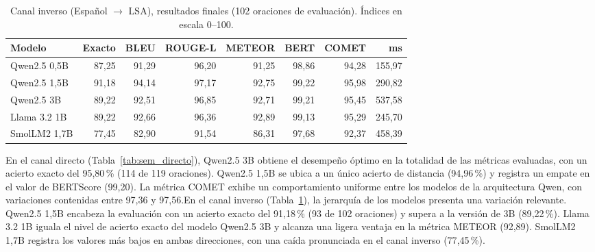 \begin{table}[H]
\centering
\footnotesize
\caption{Canal inverso (Español $\rightarrow$ LSA), resultados finales (102 oraciones de evaluación). Índices en escala 0--100.}
\label{tab:sem_inverso}
\begin{tabular}{lrrrrrrr}
\toprule
\textbf{Modelo} & \textbf{Exacto} & \textbf{BLEU} & \textbf{ROUGE-L} & \textbf{METEOR} & \textbf{BERT} & \textbf{COMET} & \textbf{ms} \\
\midrule
Qwen2.5 0,5B & 87,25 & 91,29 & 96,20 & 91,25 & 98,86 & 94,28 & 155,97 \\
Qwen2.5 1,5B & 91,18 & 94,14 & 97,17 & 92,75 & 99,22 & 95,98 & 290,82 \\
Qwen2.5 3B   & 89,22 & 92,51 & 96,85 & 92,71 & 99,21 & 95,45 & 537,58 \\
Llama 3.2 1B & 89,22 & 92,66 & 96,36 & 92,89 & 99,13 & 95,29 & 245,70 \\
SmolLM2 1,7B & 77,45 & 82,90 & 91,54 & 86,31 & 97,68 & 92,37 & 458,39 \\
\bottomrule
\end{tabular}
\end{table}

En el canal directo (Tabla~\ref{tab:sem_directo}), Qwen2.5 3B obtiene el desempeño óptimo en la totalidad de las métricas evaluadas, con un acierto exacto del 95{,}80\,\% (114 de 119 oraciones). Qwen2.5 1{,}5B se ubica a un único acierto de distancia (94{,}96\,\%) y registra un empate en el valor de BERTScore (99{,}20). La métrica COMET exhibe un comportamiento uniforme entre los modelos de la arquitectura Qwen, con variaciones contenidas entre 97{,}36 y 97{,}56.En el canal inverso (Tabla~\ref{tab:sem_inverso}), la jerarquía de los modelos presenta una variación relevante. Qwen2.5 1{,}5B encabeza la evaluación con un acierto exacto del 91{,}18\,\% (93 de 102 oraciones) y supera a la versión de 3B (89{,}22\,\%). Llama 3.2 1B iguala el nivel de acierto exacto del modelo Qwen2.5 3B y alcanza una ligera ventaja en la métrica METEOR (92{,}89). SmolLM2 1{,}7B registra los valores más bajos en ambas direcciones, con una caída pronunciada en el canal inverso (77{,}45\,\%).

